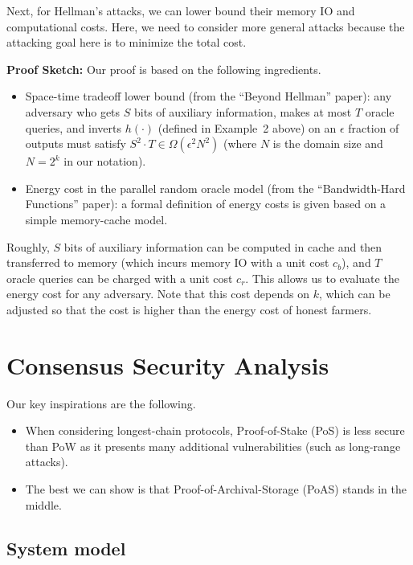 \documentclass[12pt,draftcls,onecolumn]{IEEEtran}
\begin{document}
Next, for Hellman's attacks, we can lower bound their memory IO and computational costs.
Here, we need to consider more general attacks because the attacking goal here is to minimize the total cost.

{\bf Proof Sketch:} Our proof is based on the following ingredients. 

\begin{itemize}
    \item Space-time tradeoff lower bound (from the ``Beyond Hellman'' paper): 
    any adversary who gets $S$ bits of auxiliary information, makes at most $T$
    oracle queries, and inverts $h(\cdot)$ (defined in Example~2 above) on an
    $\epsilon$ fraction of outputs must satisfy $S^2 \cdot T \in \Omega(\epsilon^2 N^2)$ (where $N$
    is the domain size and $N = 2^k$ in our notation).
    \item Energy cost in the parallel random oracle model (from the ``Bandwidth-Hard Functions'' paper): a formal definition of energy costs is given based on a simple memory-cache model.
\end{itemize}

Roughly, $S$ bits of auxiliary information can be computed in cache and then transferred to memory (which incurs memory IO with a unit cost $c_b$), and $T$ oracle queries can be charged with a unit cost $c_r$.
This allows us to evaluate the energy cost for any adversary. Note that this cost depends on $k$, which can be adjusted so that the cost is higher than the energy cost of honest farmers.

\section{Consensus Security Analysis}

Our key inspirations are the following.

\begin{itemize}
    \item When considering longest-chain protocols, Proof-of-Stake (PoS) is less secure than PoW as it presents many additional vulnerabilities (such as long-range attacks). 
    \item The best we can show is that Proof-of-Archival-Storage (PoAS) stands in the middle.
\end{itemize}

\subsection{System model}
\end{document}
